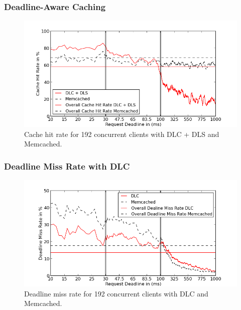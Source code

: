 \documentclass{beamer}
\begin{document}
\begin{frame}
  \frametitle{Deadline-Aware Caching}
  \begin{figure}[t]
    \begin{center}
      \centerline{\includegraphics[scale=0.5]{img/EC2/EC2_SH_MM/cache_48.png}}
      \caption{Cache hit rate for 192 concurrent clients with DLC + DLS and Memcached.}
      \label{fig:cache_192_sh_mm}
    \end{center}
  \end{figure}
\end{frame}

\begin{frame}
  \frametitle{Deadline Miss Rate with DLC}
  \begin{figure}[t]
    \begin{center}
      \centerline{\includegraphics[scale=0.5]{img/EC2/EC2_CS_MM/miss_48.png}}
      \caption{Deadline miss rate for 192 concurrent clients with DLC and Memcached.}
      \label{fig:miss_192_cs_mm}
    \end{center}
  \end{figure}
\end{frame}
\end{document}
